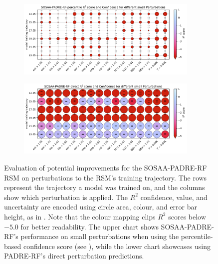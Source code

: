 \vspace{-1em}
\begin{figure}[H]
    \centering
    \begin{subfigure}
        \centering
        \includegraphics[width=0.95\textwidth]{evaluation/figures/results/perturbation-generalisation-percentile-padre-rf-small.pdf}
    \end{subfigure}

    \begin{subfigure}
        \centering
        \includegraphics[width=0.95\textwidth]{evaluation/figures/results/perturbation-generalisation-padre-rf-direct-small.pdf}
    \end{subfigure}

    \vspace{-1em}
    \caption[Evaluation of Improvements to the SOSAA-PADRE-RF RSM]{Evaluation of potential improvements for the SOSAA-PADRE-RF RSM on perturbations to the RSM's training trajectory. The rows represent the trajectory a model was trained on, and the columns show which perturbation is applied. The $R^2$ confidence, value, and uncertainty are encoded using circle area, colour, and error bar height, as in . Note that the colour mapping clips $R^2$ scores below $-5.0$ for better readability. The upper chart shows SOSAA-PADRE-RF's performance on small perturbations when using the percentile-based confidence score (see ), while the lower chart showcases using PADRE-RF's direct perturbation predictions.}
    \label{fig:sosaa-rsm-perturbations-improvements}
\end{figure}

